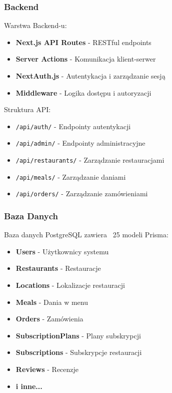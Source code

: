 \documentclass[12pt,a4paper,utf-8]{article}
\begin{document}
\subsubsection{Backend}

Warstwa Backend-u:
\begin{itemize}
    \item \textbf{Next.js API Routes}  -  RESTful endpoints
    \item \textbf{Server Actions}  -  Komunikacja klient-serwer
    \item \textbf{NextAuth.js}  -  Autentykacja i zarządzanie sesją
    \item \textbf{Middleware}  -  Logika dostępu i autoryzacji
\end{itemize}

Struktura API:
\begin{itemize}
    \item \texttt{/api/auth/}  -  Endpointy autentykacji
    \item \texttt{/api/admin/}  -  Endpointy administracyjne
    \item \texttt{/api/restaurants/}  -  Zarządzanie restauracjami
    \item \texttt{/api/meals/}  -  Zarządzanie daniami
    \item \texttt{/api/orders/}  -  Zarządzanie zamówieniami
\end{itemize}

\subsubsection{Baza Danych}

Baza danych PostgreSQL zawiera ~25 modeli Prisma:

\begin{itemize}
    \item \textbf{Users}  -  Użytkownicy systemu
    \item \textbf{Restaurants}  -  Restauracje
    \item \textbf{Locations}  -  Lokalizacje restauracji
    \item \textbf{Meals}  -  Dania w menu
    \item \textbf{Orders}  -  Zamówienia
    \item \textbf{SubscriptionPlans}  -  Plany subskrypcji
    \item \textbf{Subscriptions}  -  Subskrypcje restauracji
    \item \textbf{Reviews}  -  Recenzje
    \item \textbf{i inne...}
\end{itemize}
\end{document}
